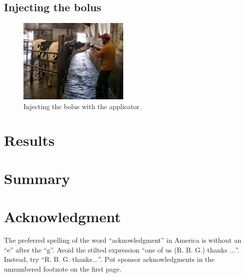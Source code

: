 \documentclass[conference]{IEEEtran}
\begin{document}
\subsection{Injecting the bolus}

\begin{figure}[htbp]
\centerline{\includegraphics[width=0.48\textwidth]{fig/bolus_application.jpg}}
  \caption{Injecting the bolus with the applicator.}
\label{bolus-gw-photo}
\end{figure}


\section{Results}

\cite{nagl2003}

\section{Summary}

\section*{Acknowledgment}

The preferred spelling of the word ``acknowledgment'' in America is without 
an ``e'' after the ``g''. Avoid the stilted expression ``one of us (R. B. 
G.) thanks $\ldots$''. Instead, try ``R. B. G. thanks$\ldots$''. Put sponsor 
acknowledgments in the unnumbered footnote on the first page.



\end{document}

